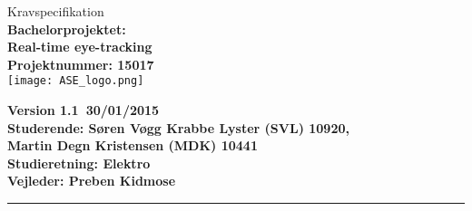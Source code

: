 \documentclass[a4paper,oneside,12pt]{article}
\begin{document}
\begin{titlepage}
\centering
\vfill
{\LARGE Kravspecifikation}\\
\vfill
{\bfseries\large
	Bachelorprojektet: \\
	Real-time eye-tracking\\
	Projektnummer: 15017\\
}
\vfill
\texttt{[image: ASE\_logo.png]}
\vfill
{\bfseries\large
	Version 1.1\
	30/01/2015\\
	Studerende: Søren Vøgg Krabbe Lyster (SVL) 10920,\\
	Martin Degn Kristensen (MDK) 10441\\ 
	Studieretning: Elektro \\
	Vejleder: Preben Kidmose \\
	\vfill	
	\rule{6cm}{1pt}
}




\end{titlepage}
\begin{versionhistory}
\end{versionhistory}
\tableofcontents



	



\end{document}
